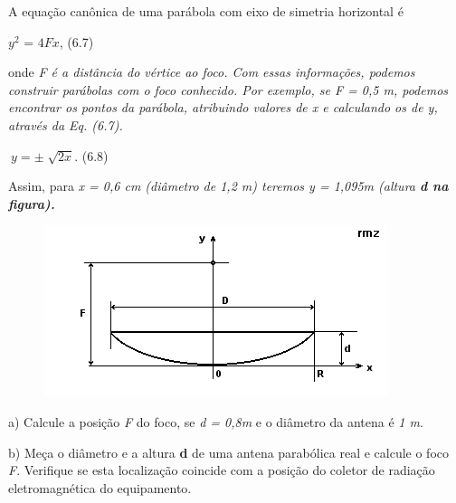 A equação canônica de uma parábola com eixo de simetria horizontal é

$y^2$ = $4Fx$, \tab (6.7)

onde \textit{F é a distância do vértice ao foco. Com essas informações, podemos construir parábolas com o foco conhecido. Por exemplo, se  F = 0,5 m, podemos encontrar os pontos da parábola, atribuindo valores de x e calculando os de y, através da Eq. (6.7).}

 \( ~ y=  \pm \sqrt[]{2x} \). \tab (6.8)

Assim, para \textit{x = 0,6 cm (diâmetro de 1,2 m) teremos y = 1,095m (altura \textbf{d na figura).}}

\begin{figure}[H]
	\begin{Center}
		\includegraphics[width=3.95in,height=1.97in]{capitulos/funcao_do_segundo_grau/media/image23.png}
	\end{Center}
\end{figure}

	a) Calcule a posição \textit{F} do foco, se \textit{d = 0,8m}  e o diâmetro da antena é \textit{1 m}. 

	b) Meça o diâmetro e a altura \textbf{d} de uma antena parabólica real e calcule o foco \textit{F}. Verifique se esta localização coincide com a posição do coletor de radiação eletromagnética do equipamento.

